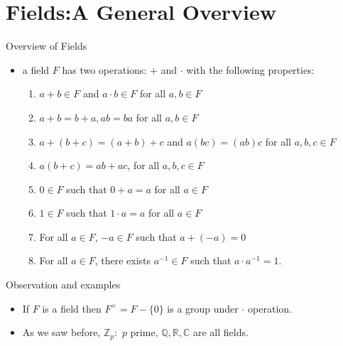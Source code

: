 \documentclass[ %
 10pt, xcolor={dvipsnames,svgnames,x11names,hyperref},
   hyperref={colorlinks=true,citecolor=green,linkcolor=DarkRed,urlcolor=ProcessBlue,anchorcolor=blue}
  ]{beamer}
\newenvironment{stepitemize}{\begin{itemize}[<+->]}{\end{itemize} }
\newcommand{\Z}{\mathbb{Z}}
\newcommand{\Q}{\mathbb{Q}}
\newcommand{\R}{\mathbb{R}}
\newcommand{\C}{\mathbb{C}}
\begin{document}
\section{Fields:A General Overview}
\begin{frame}{Overview of Fields}
\begin{stepitemize}
    \item a field $F$ has two operations: $+$ and $\cdot$ with the following properties:
\begin{enumerate}
    \item $a+b\in F$ and $a\cdot b \in F$ for all $a,b\in F$
    \item $a+b=b+a, ab=ba$ for all $a,b\in F$
    \item $a+(b+c)=(a+b)+c$ and $a(bc) = (ab)c$ for all $a,b,c \in F$
    \item $a(b+c)=ab+ac$, for all $a,b,c \in F$
    \item $0\in F$ such that $0+a=a$ for all $a\in F$
    \item $1\in F$ such that $1\cdot a=a$ for all $a\in F$
    \item For all $a\in F$, $-a \in F$ such that $a+(-a)=0$
    \item For all $a \in F$, there exists $a^{-1}\in F$ such that $a\cdot a^{-1}=1$.
\end{enumerate}
\end{stepitemize}
\end{frame}

\begin{frame}{Observation and examples}
\begin{stepitemize}
    \item If  $F$ is a field then $F^{\times} = F-\{0\}$ is a group under $\cdot$ operation.
\item As we saw before, $\Z_p:$ $p$ prime, $\Q, \R, \C$ are all fields.
\end{stepitemize}
\end{frame}
\end{document}

